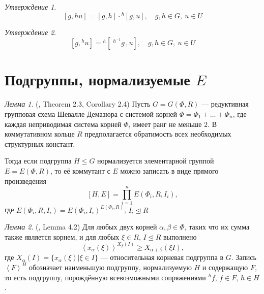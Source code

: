 \documentclass[10pt]{article}
\theoremstyle{break}
\theoremstyle{remark}
\newtheorem{prop}{Утверждение}
\newtheorem{lm}{Лемма}
\renewcommand{\le}{\leqslant}
\renewcommand{\ge}{\geqslant}
\begin{document}
\begin{prop}
  $$[g,hu] = [g,h]\cdot{}^h[g,u], \quad g,h \in G, \ u \in U $$
\end{prop}

\begin{prop}
  $$[g,{}^{h}u] = {}^h[\;{}^{h^{-1}}g\,,u], \quad g,h \in G, \ u \in U $$
\end{prop}


\section{Подгруппы, нормализуемые $E$}

\begin{lm}(\citep{Stavrova2009}, Theorem 2.3, Corollary 2.4)
  \label{directproduct}
  Пусть $G = G(\Phi, R)$ --- редуктивная групповая схема Шевалле-Демазюра
  с системой корней $\Phi = \Phi_1 + \ldots + \Phi_n$, где каждая неприводимая система корней $\Phi_i$ имеет ранг не меньше $2$. В коммутативном кольце $R$ предполагается обратимость всех необходимых структурных констант.
  
  Тогда если подгруппа $H \le G$ нормализуется элементарной группой $E = E(\Phi,R)$, то её коммутант с $E$ можно записать в виде прямого произведения
  $$ [H, E] = \prod_{i=1}^n E(\Phi_i,R,I_i), $$
  где $E(\Phi_i,R,I_i) = E(\Phi_i,I_i)^{E(\Phi_i,R)}$, $I_i \trianglelefteq R$
\end{lm}

\begin{lm}(\citep{Stavrova2009}, Lemma 4.2)
  \label{transitivity}
  Для любых двух корней $\alpha, \beta \in \Phi$, таких что их сумма также является корнем, и для любых  $\xi \in R$, $I \trianglelefteq R$ выполнено
  $$ \left< x_\alpha(\xi) \right>^{X_\beta(I)} \ge X_{\alpha + \beta}(\xi I), $$  
  где $X_\alpha(I) = \{x_\alpha(\xi) | \xi \in I\}$ --- относительная корневая подгруппа в $G$. Запись $\left<F\right>^H$ обозначает наименьшую подгруппу, нормализуемую $H$ и содержащую $F$, то есть подгруппу, порождённую всевозможными сопряжениями $^hf$, $f \in F$, $h \in H$.
\end{lm}
\end{document}
